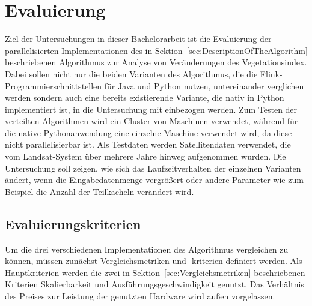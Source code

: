 
\chapter{Evaluierung}
Ziel der Untersuchungen in dieser Bachelorarbeit ist die Evaluierung der parallelisierten Implementationen des in Sektion~\ref{sec:DescriptionOfTheAlgorithm} beschriebenen Algorithmus zur Analyse von Veränderungen des Vegetationsindex. Dabei sollen nicht nur die beiden Varianten des Algorithmus, die die Flink-Programmierschnittstellen für Java und Python nutzen, untereinander verglichen werden sondern auch eine bereits existierende Variante, die nativ in Python implementiert ist, in die Untersuchung mit einbezogen werden. Zum Testen der verteilten Algorithmen wird ein Cluster von Maschinen verwendet, während für die native Pythonanwendung eine einzelne Maschine verwendet wird, da diese nicht parallelisierbar ist. Als Testdaten werden Satellitendaten verwendet, die vom Landsat-System über mehrere Jahre hinweg aufgenommen wurden. Die Untersuchung soll zeigen, wie sich das Laufzeitverhalten der einzelnen Varianten ändert, wenn die Eingabedatenmenge vergrößert oder andere Parameter wie zum Beispiel die Anzahl der Teilkacheln verändert wird.

\section{Evaluierungskriterien}
\label{sec:evaluationCriteria}
Um die drei verschiedenen Implementationen des Algorithmus vergleichen zu können, müssen zunächst Vergleichsmetriken und -kriterien definiert werden. Als Hauptkriterien werden die zwei in Sektion~\ref{sec:Vergleichsmetriken} beschriebenen Kriterien Skalierbarkeit und Ausführungsgeschwindigkeit genutzt. Das Verhältnis des Preises zur Leistung der genutzten Hardware wird außen vorgelassen. 

